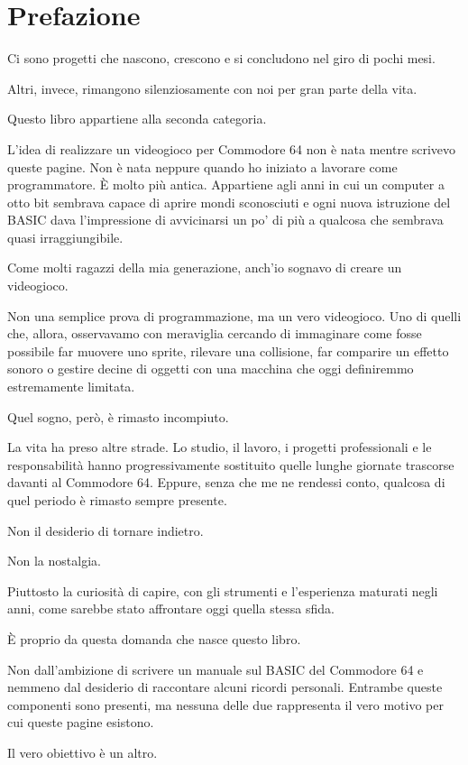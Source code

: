 \documentclass{article}
\author{HP}
\date{2026-07-26}
\begin{document}
\section{Prefazione}
Ci sono progetti che nascono, crescono e si concludono nel giro di pochi mesi.

Altri, invece, rimangono silenziosamente con noi per gran parte della vita.

Questo libro appartiene alla seconda categoria.

L'idea di realizzare un videogioco per Commodore 64 non è nata mentre scrivevo queste pagine. Non è nata neppure quando
ho iniziato a lavorare come programmatore. È molto più antica. Appartiene agli anni in cui un computer a otto bit
sembrava capace di aprire mondi sconosciuti e ogni nuova istruzione del BASIC dava l'impressione di avvicinarsi un po'
di più a qualcosa che sembrava quasi irraggiungibile.

Come molti ragazzi della mia generazione, anch'io sognavo di creare un videogioco.

Non una semplice prova di programmazione, ma un vero videogioco. Uno di quelli che, allora, osservavamo con meraviglia
cercando di immaginare come fosse possibile far muovere uno sprite, rilevare una collisione, far comparire un effetto
sonoro o gestire decine di oggetti con una macchina che oggi definiremmo estremamente limitata.

Quel sogno, però, è rimasto incompiuto.

La vita ha preso altre strade. Lo studio, il lavoro, i progetti professionali e le responsabilità hanno progressivamente
sostituito quelle lunghe giornate trascorse davanti al Commodore 64. Eppure, senza che me ne rendessi conto, qualcosa
di quel periodo è rimasto sempre presente.

Non il desiderio di tornare indietro.

Non la nostalgia.

Piuttosto la curiosità di capire, con gli strumenti e l'esperienza maturati negli anni, come sarebbe stato affrontare
oggi quella stessa sfida.

È proprio da questa domanda che nasce questo libro.

Non dall'ambizione di scrivere un manuale sul BASIC del Commodore 64 e nemmeno dal desiderio di raccontare alcuni
ricordi personali. Entrambe queste componenti sono presenti, ma nessuna delle due rappresenta il vero motivo per cui
queste pagine esistono.

Il vero obiettivo è un altro.
\end{document}
